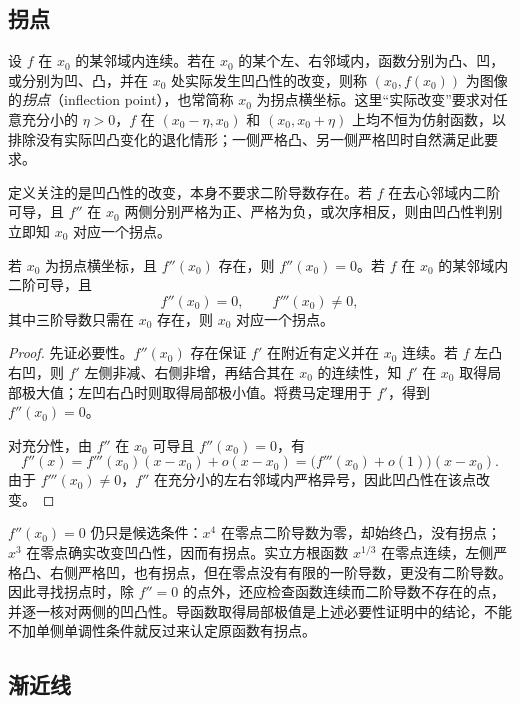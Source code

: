 \subsection{拐点}
\label{subsec:inflection-points}

\begin{definition}
\label{def:inflection-point}
设 $f$ 在 $x_0$ 的某邻域内连续。若在 $x_0$ 的某个左、右邻域内，函数分别为凸、凹，或分别为凹、凸，并在 $x_0$ 处实际发生凹凸性的改变，则称 $(x_0,f(x_0))$ 为图像的\emph{拐点}（inflection point），也常简称 $x_0$ 为拐点横坐标。这里“实际改变”要求对任意充分小的 $\eta>0$，$f$ 在 $(x_0-\eta,x_0)$ 和 $(x_0,x_0+\eta)$ 上均不恒为仿射函数，以排除没有实际凹凸变化的退化情形；一侧严格凸、另一侧严格凹时自然满足此要求。
\end{definition}

定义关注的是凹凸性的改变，本身不要求二阶导数存在。若 $f$ 在去心邻域内二阶可导，且 $f''$ 在 $x_0$ 两侧分别严格为正、严格为负，或次序相反，则由凹凸性判别立即知 $x_0$ 对应一个拐点。

\begin{theorem}[拐点的必要条件与一个充分条件]
\label{thm:inflection-derivative-tests}
若 $x_0$ 为拐点横坐标，且 $f''(x_0)$ 存在，则 $f''(x_0)=0$。若 $f$ 在 $x_0$ 的某邻域内二阶可导，且
\[
    f''(x_0)=0,\qquad f'''(x_0)\neq0,
\]
其中三阶导数只需在 $x_0$ 存在，则 $x_0$ 对应一个拐点。
\end{theorem}

\begin{proof}
先证必要性。$f''(x_0)$ 存在保证 $f'$ 在附近有定义并在 $x_0$ 连续。若 $f$ 左凸右凹，则 $f'$ 左侧非减、右侧非增，再结合其在 $x_0$ 的连续性，知 $f'$ 在 $x_0$ 取得局部极大值；左凹右凸时则取得局部极小值。将费马定理用于 $f'$，得到 $f''(x_0)=0$。

对充分性，由 $f''$ 在 $x_0$ 可导且 $f''(x_0)=0$，有
\[
    f''(x)=f'''(x_0)(x-x_0)+o(x-x_0)
           =\bigl(f'''(x_0)+o(1)\bigr)(x-x_0).
\]
由于 $f'''(x_0)\neq0$，$f''$ 在充分小的左右邻域内严格异号，因此凹凸性在该点改变。
\end{proof}

$f''(x_0)=0$ 仍只是候选条件：$x^4$ 在零点二阶导数为零，却始终凸，没有拐点；$x^3$ 在零点确实改变凹凸性，因而有拐点。实立方根函数 $x^{1/3}$ 在零点连续，左侧严格凸、右侧严格凹，也有拐点，但在零点没有有限的一阶导数，更没有二阶导数。因此寻找拐点时，除 $f''=0$ 的点外，还应检查函数连续而二阶导数不存在的点，并逐一核对两侧的凹凸性。导函数取得局部极值是上述必要性证明中的结论，不能不加单侧单调性条件就反过来认定原函数有拐点。

\subsection{渐近线}
\label{subsec:asymptotes}

